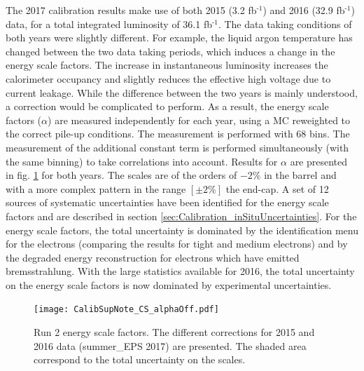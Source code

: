 The 2017 calibration results make use of both 2015 (3.2 fb\(^{\text{-1}}\)) and 2016 (32.9 fb\(^{\text{-1}}\)) data, for a total integrated luminosity of 36.1 fb\(^{\text{-1}}\).
The data taking conditions of both years were slightly different.
For example, the liquid argon temperature has changed between the two data taking periods, which induces a change in the energy scale factors.
The increase in instantaneous luminosity increases the calorimeter occupancy and slightly reduces the effective high voltage due to current leakage.
While the difference between the two years is mainly understood, a correction would be complicated to perform.
As a result, the energy scale factors (\(\alpha\)) are measured independently for each year, using a MC reweighted to the correct pile-up conditions.
The measurement is performed with 68 bins.
The measurement of the additional constant term is performed simultaneously (with the same binning) to take correlations into account.
Results for \(\alpha\) are presented in fig. \ref{fig:org0ac8cf8} for both years.
The scales are of the orders of $-2\%$ in the barrel and with a more complex pattern in the range $[\pm2\%]$ the end-cap.
A set of 12 sources of systematic uncertainties have been identified for the energy scale factors and are described in section \ref{sec:Calibration_inSituUncertainties}.
For the energy scale factors, the total uncertainty is dominated by the identification menu for the electrons (comparing the results for tight and medium electrons) and by the degraded energy reconstruction for electrons which have emitted bremsstrahlung.
With the large statistics available for 2016, the total uncertainty on the energy scale factors is now dominated by experimental uncertainties.

\begin{figure}[htbp]
\centering
\texttt{[image: CalibSupNote\_CS\_alphaOff.pdf]}
\caption{\label{fig:org0ac8cf8}
  Run 2 energy scale factors. The different corrections for 2015 and 2016 data (summer\_EPS 2017) are presented.
  The shaded area correspond to the total uncertainty on the scales.
  \cite{EPSCalib}}
\end{figure}


